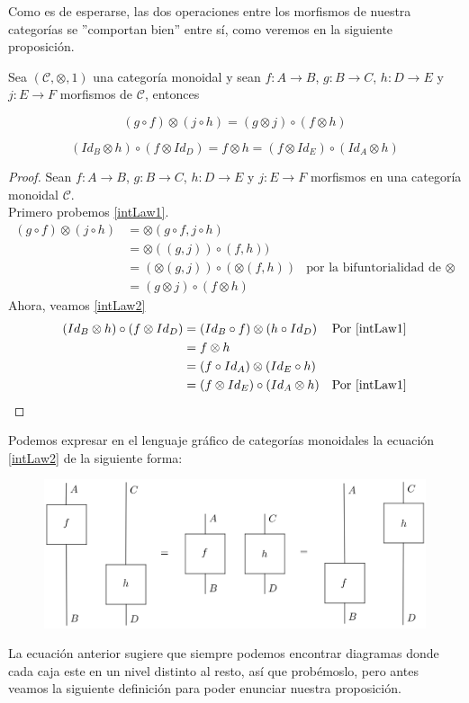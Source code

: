 \documentclass[../main.tex]{subfiles}
\begin{document}
Como es de esperarse, las dos operaciones entre los morfismos de nuestra categorías se ''comportan bien'' entre sí, como veremos en la siguiente proposición. 
\begin{prop}
	Sea $(\mathcal{C},\otimes , 1)$ una categoría monoidal y sean $f:A \to B$, $g:B \to C$, $h:D \to E$ y $j:E \to F$ morfismos de $\mathcal{C}$, entonces
	
	\begin{equation} \label{intLaw1}
		(g\circ f) \otimes (j \circ h) = (g \otimes j) \circ (f \otimes h)
	\end{equation}
	
	\begin{equation} \label{intLaw2}
		 (Id_B \otimes h) \circ (f \otimes Id_D) = f \otimes h = (f \otimes Id_E) \circ (Id_A \otimes h) 
	\end{equation} 
	 
\end{prop} 

\begin{proof}
	Sean $f:A \to B$, $g:B \to C$, $h:D \to E$ y $j:E \to F$ morfismos en una categoría monoidal $\mathcal{C}$. \\
	Primero probemos \ref{intLaw1}.
	\begin{align*}
		(g\circ f) \otimes (j \circ h) &= \otimes (g\circ f, j \circ h) \\
		&= \otimes ((g,j)) \circ (f,h))\\
		&=(\otimes (g,j)) \circ (\otimes (f,h)) & \text{por la bifuntorialidad de $\otimes$}\\
		&=(g \otimes j) \circ (f \otimes h)
	\end{align*}
	Ahora, veamos  \ref{intLaw2}
	\begin{align*}
		(Id_B \otimes h) \circ (f \otimes Id_D) &= (Id_B \circ f) \otimes (h \circ Id_D)	& \text{Por \ref{intLaw1}}\\
		&=f \otimes h \\
		&=(f \circ Id_A) \otimes (Id_E \circ h) \\
		&= (f \otimes Id_E) \circ (Id_A \otimes h) & \text{Por \ref{intLaw1}} 
	\end{align*}
\end{proof}
Podemos expresar en el lenguaje gráfico de categorías monoidales la ecuación \ref{intLaw2} de la siguiente forma:
\begin{figure}[H]
	\includegraphics[scale=2.9]{diagrama/intercambio.png}
	\centering
	\label{intercambio}
\end{figure}
\noindent La ecuación anterior sugiere que siempre podemos encontrar diagramas donde cada caja este en un nivel distinto al resto, así que probémoslo, pero antes veamos la siguiente definición para poder enunciar nuestra proposición.
\end{document}

